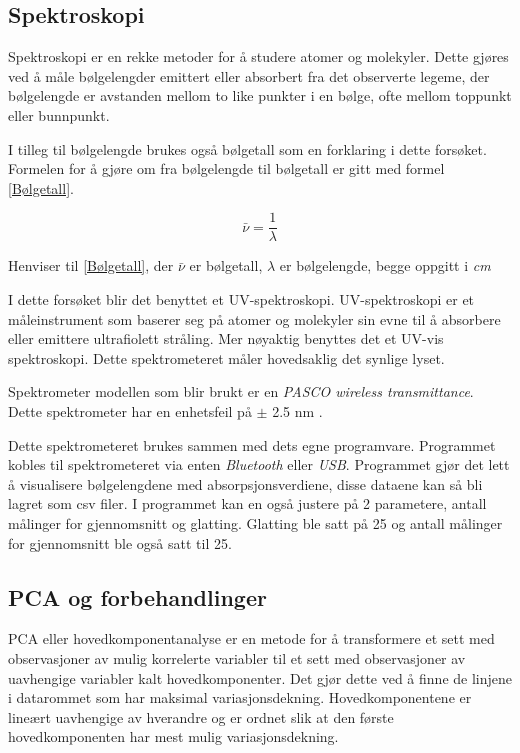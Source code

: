 \documentclass[twocolumn, 11pt]{article} %
\begin{document}
\subsection{Spektroskopi}
Spektroskopi er en rekke metoder for å studere atomer og molekyler. Dette gjøres ved å måle bølgelengder emittert eller absorbert fra det observerte legeme\cite{spektroskopi}, der bølgelengde er avstanden mellom to like punkter i en bølge, ofte mellom toppunkt eller bunnpunkt\cite{taylor1997error}.

I tilleg til bølgelengde brukes også bølgetall som en forklaring i dette forsøket. Formelen for å gjøre om fra bølgelengde til bølgetall er gitt med formel \eqref{Bølgetall}.

\begin{equation}
    \bar{\nu} = \frac{1}{\lambda}
    \label{Bølgetall}
\end{equation}

Henviser til \eqref{Bølgetall}, der \textit{$\bar{\nu}$} er bølgetall, \textit{$\lambda$} er bølgelengde, begge oppgitt i \textit{cm}

\bigskip

I dette forsøket blir det benyttet et UV-spektroskopi. UV-spektroskopi er et måleinstrument som baserer seg på atomer og molekyler sin evne til å absorbere eller emittere ultrafiolett stråling. Mer nøyaktig benyttes det et UV-vis spektroskopi. Dette spektrometeret måler hovedsaklig det synlige lyset. 

Spektrometer modellen som blir brukt er en \textit{PASCO wireless transmittance}. Dette spektrometer har en enhetsfeil på $\pm$ 2.5 nm \cite{oppgavetekst}.

Dette spektrometeret brukes sammen med dets egne programvare. Programmet kobles til spektrometeret via enten \textit{Bluetooth} eller \textit{USB}. Programmet gjør det lett å visualisere bølgelengdene med absorpsjonsverdiene, disse dataene kan så bli lagret som csv filer. I programmet kan en også justere på 2 parametere, antall målinger for gjennomsnitt og glatting. Glatting ble satt på 25 og antall målinger for gjennomsnitt ble også satt til 25. 

\subsection{PCA og forbehandlinger}
PCA eller hovedkomponentanalyse er en metode for å transformere et sett med observasjoner av mulig korrelerte variabler til et sett med observasjoner av uavhengige variabler kalt hovedkomponenter. Det gjør dette ved å finne de linjene i datarommet som har maksimal variasjonsdekning. Hovedkomponentene er lineært uavhengige av hverandre og er ordnet slik at den første hovedkomponenten har mest mulig variasjonsdekning\cite{youtube}.
\end{document}
